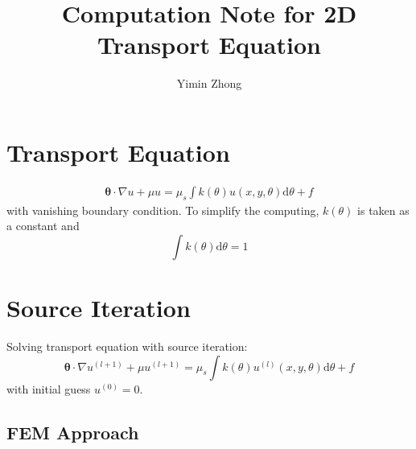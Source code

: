 \documentclass[12pt,a4paper]{article}
\author{Yimin Zhong}
\title{Computation Note for 2D Transport Equation}
\begin{document}
\maketitle
\section{Transport Equation}
\begin{eqnarray}
\mathbf{\theta}\cdot \nabla u + \mu u = \mu_s \int k(\theta) u(x,y,\theta)\mathrm{d}\theta + f
\end{eqnarray}
with vanishing boundary condition. To simplify the computing, $k(\theta)$ is taken as a constant and 
\begin{equation}
\int k(\theta)\mathrm{d}\theta = 1
\end{equation}
\section{Source Iteration}
Solving transport equation with source iteration:
\begin{equation}
\mathbf{\theta}\cdot \nabla u^{(l+1)} + \mu u^{(l+1)} = \mu_s \int k(\theta) u^{(l)}(x,y,\theta)\mathrm{d}\theta + f
\end{equation}
with initial guess $u^{(0)} = 0$. 

\subsection{FEM Approach}
\end{document}
